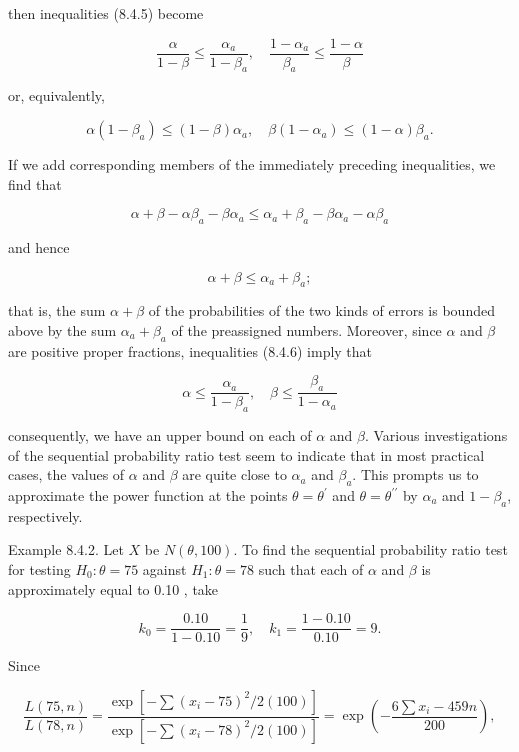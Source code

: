 then inequalities (8.4.5) become


\begin{equation*}
\frac{\alpha}{1-\beta} \leq \frac{\alpha_{a}}{1-\beta_{a}}, \quad \frac{1-\alpha_{a}}{\beta_{a}} \leq \frac{1-\alpha}{\beta} \tag{8.4.6}
\end{equation*}


or, equivalently,

$$
\alpha\left(1-\beta_{a}\right) \leq(1-\beta) \alpha_{a}, \quad \beta\left(1-\alpha_{a}\right) \leq(1-\alpha) \beta_{a} .
$$

If we add corresponding members of the immediately preceding inequalities, we find that

$$
\alpha+\beta-\alpha \beta_{a}-\beta \alpha_{a} \leq \alpha_{a}+\beta_{a}-\beta \alpha_{a}-\alpha \beta_{a}
$$

and hence

$$
\alpha+\beta \leq \alpha_{a}+\beta_{a} ;
$$

that is, the sum $\alpha+\beta$ of the probabilities of the two kinds of errors is bounded above by the sum $\alpha_{a}+\beta_{a}$ of the preassigned numbers. Moreover, since $\alpha$ and $\beta$ are positive proper fractions, inequalities (8.4.6) imply that

$$
\alpha \leq \frac{\alpha_{a}}{1-\beta_{a}}, \quad \beta \leq \frac{\beta_{a}}{1-\alpha_{a}}
$$

consequently, we have an upper bound on each of $\alpha$ and $\beta$. Various investigations of the sequential probability ratio test seem to indicate that in most practical cases, the values of $\alpha$ and $\beta$ are quite close to $\alpha_{a}$ and $\beta_{a}$. This prompts us to approximate the power function at the points $\theta=\theta^{\prime}$ and $\theta=\theta^{\prime \prime}$ by $\alpha_{a}$ and $1-\beta_{a}$, respectively.

Example 8.4.2. Let $X$ be $N(\theta, 100)$. To find the sequential probability ratio test for testing $H_{0}: \theta=75$ against $H_{1}: \theta=78$ such that each of $\alpha$ and $\beta$ is approximately equal to 0.10 , take

$$
k_{0}=\frac{0.10}{1-0.10}=\frac{1}{9}, \quad k_{1}=\frac{1-0.10}{0.10}=9 .
$$

Since

$$
\frac{L(75, n)}{L(78, n)}=\frac{\exp \left[-\sum\left(x_{i}-75\right)^{2} / 2(100)\right]}{\exp \left[-\sum\left(x_{i}-78\right)^{2} / 2(100)\right]}=\exp \left(-\frac{6 \sum x_{i}-459 n}{200}\right),
$$

